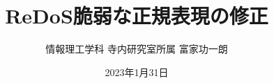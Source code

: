 
% 
% 
% 


\setcounter{tocdepth}{3}

\title{ReDoS脆弱な正規表現の修正}
\author{情報理工学科 寺内研究室所属 富家功一朗}
\date{2023年1月31日}